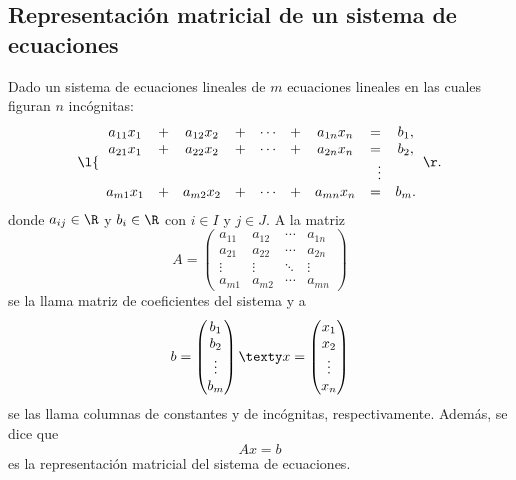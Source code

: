 \documentclass[compacto,10pt]{pubciencias-notas}
\begin{document}
\subsection{Representación matricial de un sistema de ecuaciones}
\begin{defi}
Dado un sistema de ecuaciones lineales de $m$ ecuaciones lineales en las cuales figuran $n$ incógnitas:
\[
\l\{
\begin{array}{cccccccccc}
    a_{11}x_1& + &a_{12}x_2& + &\cdots &+& a_{1n}x_n &= &b_1,\\
    a_{21}x_1& + &a_{22}x_2& + &\cdots &+& a_{2n}x_n &= &b_2,\\
            &&&    &            &        & &\hspace{2mm} \vdots&\\
    a_{m1}x_1& + &a_{m2}x_2& + &\cdots &+& a_{mn}x_n &= &b_m.
\end{array}
\r.
\]
donde $a_{ij}\in\R$ y $b_i\in \R$ con $i\in I$ y $j\in J$. A la matriz
\[
    A=\begin{pmatrix}
    a_{11} & a_{12} & \cdots & a_{1n}\\
    a_{21} & a_{22} & \cdots & a_{2n}\\
    \vdots & \vdots & \ddots & \vdots\\
    a_{m1} & a_{m2} & \cdots & a_{mn}
    \end{pmatrix}
\]
se la llama matriz de coeficientes del sistema y a 
\[
    b=\begin{pmatrix}
    b_1 \\ b_2 \\ \vdots \\ b_m
    \end{pmatrix}
    \texty
    x=\begin{pmatrix}
    x_1 \\ x_2 \\ \vdots \\ x_n
    \end{pmatrix}
\]
se las llama columnas de constantes y de incógnitas, respectivamente. Además, se dice que
\[
    Ax=b
\]
es la representación matricial del sistema de ecuaciones.
\end{defi}
\end{document}
